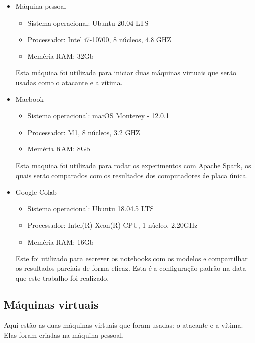 \begin{itemize}
    \item Máquina pessoal
        \begin{itemize}
            \item Sistema operacional: Ubuntu 20.04 LTS
            \item Processador: Intel i7-10700, 8 núcleos, 4.8 GHZ
            \item Meméria RAM: 32Gb
        \end{itemize}
        Esta máquina foi utilizada para iniciar duas máquinas virtuais que serão usadas 
        como o atacante e a vítima.
    \item Macbook 
        \begin{itemize}
            \item Sistema operacional: macOS Monterey - 12.0.1
            \item Processador: M1, 8 núcleos, 3.2 GHZ
            \item Meméria RAM: 8Gb
        \end{itemize}        
        Esta maquina foi utilizada para rodar os experimentos com Apache Spark, os quais 
        serão comparados com os resultados dos computadores de placa única.
    \item Google Colab
        \begin{itemize}
            \item Sistema operacional: Ubuntu 18.04.5 LTS
            \item Processador: Intel(R) Xeon(R) CPU, 1 núcleo, 2.20GHz
            \item Meméria RAM: 16Gb
        \end{itemize} 
        Este foi utilizado para escrever os notebooks com os modelos e compartilhar os resultados
        parciais de forma eficaz. Esta é a configuração padrão na data que este
        trabalho foi realizado.
\end{itemize}


\subsection{Máquinas virtuais}

Aqui estão as duas máquinas virtuais que foram usadas: o atacante e a vítima. 
Elas foram criadas na máquina pessoal.

